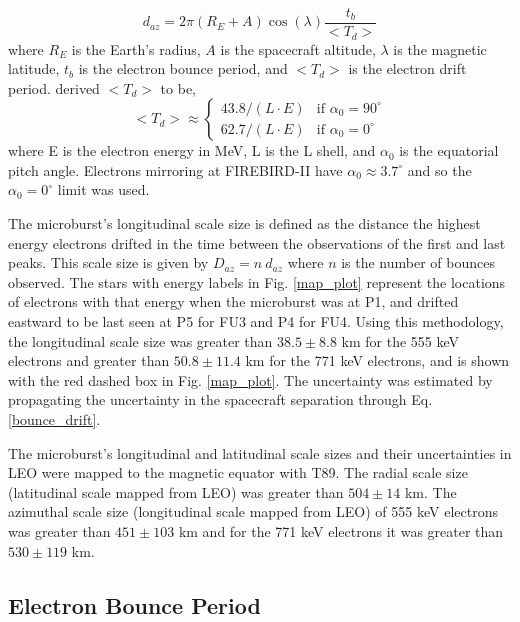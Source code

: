 \documentclass[draft, linenumbers]{agujournal}
\begin{document}
\begin{equation}
d_{az} = 2 \pi (R_E + A) \cos(\lambda) \frac{t_b}{<T_{d}>}
\label{bounce_drift}
\end{equation} where $R_E$ is the Earth's radius, $A$ is the spacecraft altitude, $\lambda$ is the magnetic latitude, $t_b$ is the electron bounce period, and $<T_{d}>$ is the electron drift period. \citet{Parks2003} derived $<T_{d}>$ to be,
\begin{equation}
<T_{d}> \approx
\begin{cases}
43.8 /(L \cdot E) & \text{if } \alpha_0 = 90^{\circ} \\    62.7/(L \cdot E) & \text{if } \alpha_0 = 0^{\circ}
\end{cases}
\label{drift}
\end{equation} where E is the electron energy in MeV, L is the L shell, and $\alpha_0$ is the equatorial pitch angle. Electrons mirroring at FIREBIRD-II have $\alpha_0 {\approx} 3.7^{\circ}$ and so the $\alpha_0 = 0^{\circ}$ limit was used.

The microburst's longitudinal scale size is defined as the distance the highest energy electrons drifted in the time between the observations of the first and last peaks. This scale size is given by $D_{az} = n \ d_{az}$ where $n$ is the number of bounces observed. The stars with energy labels in Fig. \ref{map_plot} represent the locations of electrons with that energy when the microburst was  at P1, and drifted eastward to be last seen at P5 for FU3 and P4 for FU4. Using this methodology, the  longitudinal scale size was  greater than $ 38.5 \pm 8.8$ km for the 555 keV electrons and greater than $ 50.8 \pm 11.4$ km for the 771 keV electrons, and is shown with the red dashed box in Fig. \ref{map_plot}. The uncertainty was estimated by propagating the uncertainty in the spacecraft separation through Eq. \ref{bounce_drift}.

The microburst's longitudinal and latitudinal scale sizes and their uncertainties in LEO were mapped to the magnetic equator with T89. The radial scale size (latitudinal scale mapped from LEO) was greater than $504 \pm​ 14$ km. The azimuthal scale size (longitudinal scale mapped from LEO) of 555 keV electrons was greater than $451 \pm 103$ km and for the 771 keV electrons it was greater than $530 \pm 119$ km.

\subsection{Electron Bounce Period} \label{t_b} %
\end{document}
